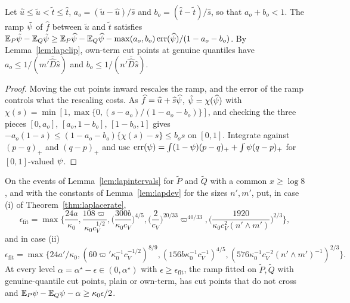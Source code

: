 \begin{lemma}
\label{lem:lapown}
Let $\widehat u\le\tilde u<\tilde t\le\widehat t$, $a_o=(\tilde u-\widehat u)/\widehat s$ and $b_o=(\widehat t-\tilde t)/\widehat
s$, so that $a_o+b_o<1$. The ramp $\tilde{\psi}$ of $\widehat f$ between $\tilde u$ and $\tilde t$ satisfies
$\mathbb{E}_P\tilde{\psi}-\mathbb{E}_Q\tilde{\psi}\ge\mathbb{E}_P\widehat{\psi}-\mathbb{E}_Q\widehat{\psi}-\max(a_o,b_o)\,\mathrm{err}(\widehat{\psi})/(1-a_o-b_o)$. By
Lemma~\ref{lem:lapclip}, own-term cut points at genuine quantiles have $a_o\le1/(m'\bar{\widehat D}\widehat s)$ and
$b_o\le1/(n'\bar{\widehat D}\widehat s)$.
\end{lemma}

\begin{proof}
Moving the cut points inward rescales the ramp, and the error of the ramp controls what the rescaling costs. As $\widehat f=\widehat u+\widehat s\widehat{\psi}$, $\tilde{\psi}=\chi(\widehat{\psi})$ with
$\chi(s)=\min[1,\max\{0,(s-a_o)/(1-a_o-b_o)\}]$, and checking the three pieces $[0,a_o]$, $[a_o,1-b_o]$, $[1-b_o,1]$
gives $-a_o(1-s)\le(1-a_o-b_o)\{\chi(s)-s\}\le b_os$ on $[0,1]$. Integrate against $(p-q)_+$ and $(q-p)_+$ and use
$\mathrm{err}(\psi)=\int(1-\psi)(p-q)_++\int\psi(q-p)_+$ for $[0,1]$-valued $\psi$.
\end{proof}

\begin{proposition}
\label{prop:lapfitted}
On the events of Lemma~\ref{lem:lapintervals} for $\tilde P$ and $\tilde Q$ with a common $x\ge\log8$, and with the
constants of Lemma~\ref{lem:lapdev} for the sizes $n',m'$, put, in case (i) of Theorem~\ref{thm:laplacerate},
\[
\epsilon_{\mathrm{fit}}=\max\Big\{\frac{24a}{\kappa_0},\frac{108\varpi}{\kappa_0c_V^{1/2}},\Big(\frac{300b}{\kappa_0c_V}\Big)^{4/5},
\Big(\frac2{c_V}\Big)^{20/33}\varpi^{40/33},\Big(\frac{1920}{\kappa_0c_V^2(n'\wedge m')}\Big)^{2/3}\Big\},
\]
and in case (ii)
\[
\epsilon_{\mathrm{fit}}=\max\{24a'/\kappa_0,(60\varpi'\kappa_0^{-1}c_V^{-1/2})^{8/9},(156b\kappa_0^{-1}c_V^{-1})^{4/5},
(576\kappa_0^{-1}c_V^{-2}(n'\wedge m')^{-1})^{2/3}\}.
\]
At every level $\alpha=\alpha^\star-\epsilon\in(0,\alpha^\star)$ with
$\epsilon\ge\epsilon_{\mathrm{fit}}$, the ramp fitted on $\tilde P,\tilde Q$ with genuine-quantile cut points, plain or
own-term, has cut points that do not cross and $\mathbb{E}_P\psi-\mathbb{E}_Q\psi-\alpha\ge\kappa_0\epsilon/2$.
\end{proposition}

